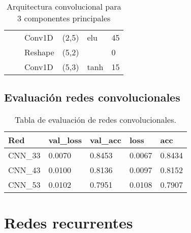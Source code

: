 \begin{table}[H]
\begin{center}
\begin{tabular}{ll|l|l|l|l|}
\multicolumn{1}{|l|}{}                                                                  &                                   & Conv1D                             & (2,5)                                & elu                                     & 45                                          \\ \cline{3-6} 
\multicolumn{1}{|l|}{}                                                                  &                                   & Reshape                            & (5,2)                                &                                          & 0                                           \\ \cline{3-6} 
\multicolumn{1}{|l|}{}                                                                  &                                   & Conv1D                             & (5,3)                                & tanh                                     & 15                                          \\ \hline
\end{tabular}

\end{center}
\caption{Arquitectura convolucional para 3 componentes principales}
\label{table:cnn_3}
\end{table}

\subsection{Evaluaci\'{o}n redes convolucionales}

\begin{table}[H]
\centering
\begin{tabular}{|l|l|l|l|l|}
\hline
\textbf{Red} & \textbf{val\_loss} & \textbf{val\_acc} & \textbf{loss} & \textbf{acc} \\ \hline
CNN\_33 & 0.0070 & 0.8453 & 0.0067 & 0.8434 \\ \hline
CNN\_43 & 0.0100 & 0.8136 & 0.0097 & 0.8152 \\ \hline
CNN\_53 & 0.0102 & 0.7951 & 0.0108 & 0.7907 \\ \hline
\end{tabular}
\caption{Tabla de evaluaci\'{o}n de redes convolucionales.}
\label{table:evaluacion_cnn}
\end{table}

\section{Redes recurrentes}


